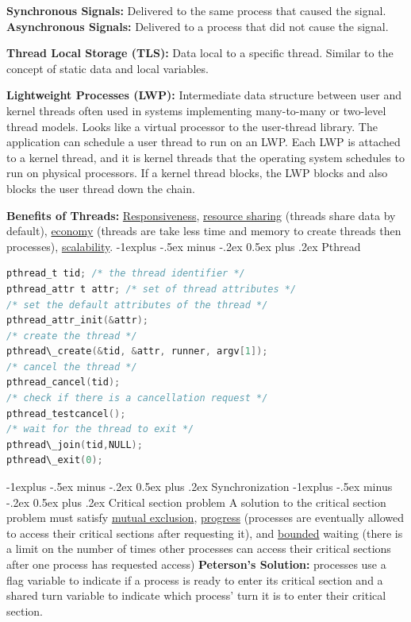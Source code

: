 \documentclass[letterpaper, 8pt]{extarticle}
\makeatletter
\renewcommand{\section}{\@startsection{section}{1}{0mm}%
                                {-1explus -.5ex minus -.2ex}%
                                {0.5ex plus .2ex}%
                                {\normalfont\normalsize\bfseries}}
\renewcommand{\subsection}{\@startsection{subsection}{2}{0mm}%
                                {-1explus -.5ex minus -.2ex}%
                                {0.5ex plus .2ex}%
                                {\normalfont\small\bfseries}}
\makeatother
\begin{document}
\begin{multicols*}{6}
    \textbf{Synchronous Signals:} Delivered to the same process that caused the
    signal.
    \textbf{Asynchronous Signals:} Delivered to a process that did not cause the
    signal.

    \textbf{Thread Local Storage (TLS):} Data local to a specific thread. Similar
    to the concept of static data and local variables.

    \textbf{Lightweight Processes (LWP):} Intermediate data structure between
    user and kernel threads often used in systems implementing many-to-many or
    two-level thread models. Looks like a virtual processor to the user-thread
    library. The application can schedule a user thread to
    run on an LWP. Each LWP is attached to a kernel thread, and it is kernel
    threads that the operating system schedules to run on physical processors.
    If a kernel thread blocks, the LWP blocks and also blocks the user thread
    down the chain.

    \textbf{Benefits of Threads:} \underline{Responsiveness},
    \underline{resource sharing} (threads share data by default),
    \underline{economy} (threads are take less time and memory to create
    threads then processes), \underline{scalability}.
    \subsection{Pthread}
    \begin{lstlisting}[language=C]
pthread_t tid; /* the thread identifier */
pthread_attr t attr; /* set of thread attributes */
/* set the default attributes of the thread */
pthread_attr_init(&attr);
/* create the thread */
pthread\_create(&tid, &attr, runner, argv[1]);
/* cancel the thread */
pthread_cancel(tid);
/* check if there is a cancellation request */
pthread_testcancel();
/* wait for the thread to exit */
pthread\_join(tid,NULL);
pthread\_exit(0);
\end{lstlisting}
    \section{Synchronization}
    \subsection{Critical section problem}
    A solution to the critical section problem must satisfy
    \underline{mutual exclusion},
    \underline{progress} (processes are eventually allowed to access their
    critical sections after requesting it), and
    \underline{bounded} waiting (there is a limit
    on the number of times other processes can access their critical sections
    after one process has requested access)
    \textbf{Peterson's Solution:} processes use a flag variable to indicate
    if a process is ready to enter its critical section and a shared
    turn variable to indicate which process' turn it is to enter their
    critical section.



\end{multicols*}
\end{document}
